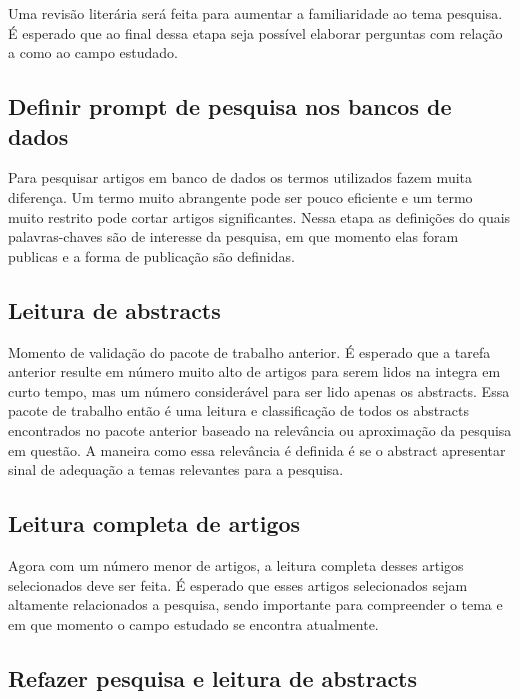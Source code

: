 Uma revisão literária será feita para aumentar a familiaridade ao tema pesquisa. É esperado que ao final dessa etapa seja possível elaborar perguntas com relação a como ao campo estudado.

\subsection{Definir prompt de pesquisa nos bancos de dados}
\label{subsec:revisao_prompt}

Para pesquisar artigos em banco de dados os termos utilizados fazem muita diferença. Um termo muito abrangente pode ser pouco eficiente e um termo muito restrito pode cortar artigos significantes. Nessa etapa as definições do quais palavras-chaves são de interesse da pesquisa, em que momento elas foram publicas e a forma de publicação são definidas. 

\subsection{Leitura de abstracts}
\label{subsec:revisao_abstracts}

Momento de validação do pacote de trabalho anterior. É esperado que a tarefa anterior resulte em número muito alto de artigos para serem lidos na integra em curto tempo, mas um número considerável para ser lido apenas os abstracts. Essa pacote de trabalho então é uma leitura e classificação de todos os abstracts encontrados no pacote anterior baseado na relevância ou aproximação da pesquisa em questão. A maneira como essa relevância é definida é se o abstract apresentar sinal de adequação a temas relevantes para a pesquisa.

\subsection{Leitura completa de artigos}
\label{subsec:revisao_completa}

Agora com um número menor de artigos, a leitura completa desses artigos selecionados deve ser feita. É esperado que esses artigos selecionados sejam altamente relacionados a pesquisa, sendo importante para compreender o tema e em que momento o campo estudado se encontra atualmente.

\subsection{Refazer pesquisa e leitura de abstracts}
\label{subsec:revisao_refazer}

